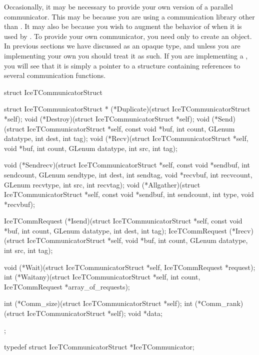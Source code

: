 Occasionally, it may be necessary to provide your own version of a parallel
communicator.  This may be because you are using a communication library
other than \MPI.  It may also be because you wish to augment the behavior
of \MPI when it is used by \IceT.  To provide your own communicator, you
need only to create an  object.  In previous
sections we have discussed  as an opaque type, and
unless you are implementing your own you should treat it as such.  If you
are implementing a , you will see that it is simply
a pointer to a structure containing references to several communication
functions.

\begin{code}
struct IceTCommunicatorStruct {
    struct IceTCommunicatorStruct *
         (*Duplicate)(struct IceTCommunicatorStruct *self);
    void (*Destroy)(struct IceTCommunicatorStruct *self);
    void (*Send)(struct IceTCommunicatorStruct *self,
                 const void *buf, int count, GLenum datatype, int dest,
                 int tag);
    void (*Recv)(struct IceTCommunicatorStruct *self,
                 void *buf, int count, GLenum datatype, int src, int tag);

    void (*Sendrecv)(struct IceTCommunicatorStruct *self,
                     const void *sendbuf, int sendcount, GLenum sendtype,
                     int dest, int sendtag,
                     void *recvbuf, int recvcount, GLenum recvtype,
                     int src, int recvtag);
    void (*Allgather)(struct IceTCommunicatorStruct *self,
                      const void *sendbuf, int sendcount, int type,
                      void *recvbuf);

    IceTCommRequest (*Isend)(struct IceTCommunicatorStruct *self,
                             const void *buf, int count, GLenum datatype,
                             int dest, int tag);
    IceTCommRequest (*Irecv)(struct IceTCommunicatorStruct *self,
                             void *buf, int count, GLenum datatype,
                             int src, int tag);

    void (*Wait)(struct IceTCommunicatorStruct *self, IceTCommRequest *request);
    int  (*Waitany)(struct IceTCommunicatorStruct *self,
                    int count, IceTCommRequest *array_of_requests);

    int  (*Comm_size)(struct IceTCommunicatorStruct *self);
    int  (*Comm_rank)(struct IceTCommunicatorStruct *self);
    void *data;
};

typedef struct IceTCommunicatorStruct *IceTCommunicator;
\end{code}

